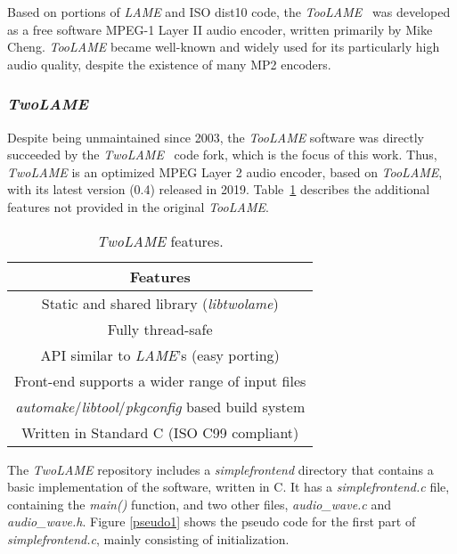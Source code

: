 Based on portions of \textit{LAME} and ISO dist10 code, the \textit{TooLAME}~\cite{bib:toolame} was developed as a free software MPEG-1 Layer II audio encoder, written primarily by Mike Cheng. \textit{TooLAME} became well-known and widely used for its particularly high audio quality, despite the existence of many MP2 encoders.

\subsubsection{\textit{TwoLAME}}

Despite being unmaintained since 2003, the \textit{TooLAME} software was directly succeeded by the \textit{TwoLAME}~\cite{bib:twolame} code fork, which is the focus of this work.
Thus, \textit{TwoLAME} is an optimized MPEG Layer 2 audio encoder, based on \textit{TooLAME}, with its latest version (0.4) released in 2019. 
Table~\ref{tab:twolame} describes the additional features not provided in the original \textit{TooLAME}.

\vspace{0.5cm}

\begin{table}[H]
    \centering
    \begin{tabular}{|c|}
        \hline
        \textbf{Features} \\
        \hline
         Static and shared library (\textit{libtwolame}) \\
         \hline
         Fully thread-safe\\
         \hline
         API similar to \textit{LAME}'s (easy porting) \\
         \hline
         Front-end supports a wider range of input files \\
         \hline
         \textit{automake}/\textit{libtool}/\textit{pkgconfig} based build system \\
         \hline
         Written in Standard C (ISO C99 compliant)\\
         \hline
    \end{tabular}
    \caption{\textit{TwoLAME} features.}
    \label{tab:twolame}
\end{table}

The \textit{TwoLAME} repository includes a \textit{simplefrontend} directory that contains a basic implementation of the software, written in C.
It has a \textit{simplefrontend.c} file, containing the \textit{main()} function, and two other files, \textit{audio\_wave.c} and \textit{audio\_wave.h}.
Figure \ref{pseudo1} shows the pseudo code for the first part of \textit{simplefrontend.c}, mainly consisting of initialization.

